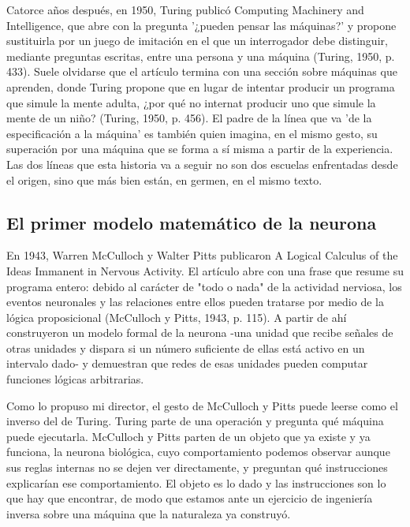 Catorce años después, en 1950, Turing publicó Computing Machinery and Intelligence, que abre con la pregunta '¿pueden pensar las máquinas?' y propone sustituirla por un juego de imitación en el que un interrogador debe distinguir, mediante preguntas escritas, entre una persona y una máquina (Turing, 1950, p. 433). Suele olvidarse que el artículo termina con una sección sobre máquinas que aprenden, donde Turing propone que en lugar de intentar producir un programa que simule la mente adulta, ¿por qué no internat producir uno que simule la mente de un niño? (Turing, 1950, p. 456). El padre de la línea que va 'de la especificación a la máquina' es también quien imagina, en el mismo gesto, su superación por una máquina que se forma a sí misma a partir de la experiencia. Las dos líneas que esta historia va a seguir no son dos escuelas enfrentadas desde el origen, sino que más bien están, en germen, en el mismo texto.

\subsection{El primer modelo matemático de la neurona}

En 1943, Warren McCulloch y Walter Pitts publicaron A Logical Calculus of the Ideas Immanent in Nervous Activity. El artículo abre con una frase que resume su programa entero: debido al carácter de "todo o nada" de la actividad nerviosa, los eventos neuronales y las relaciones entre ellos pueden tratarse por medio de la lógica proposicional (McCulloch y Pitts, 1943, p. 115). A partir de ahí construyeron un modelo formal de la neurona -una unidad que recibe señales de otras unidades y dispara si un número suficiente de ellas está activo en un intervalo dado- y demuestran que redes de esas unidades pueden computar funciones lógicas arbitrarias.

Como lo propuso mi director, el gesto de McCulloch y Pitts puede leerse como el inverso del de Turing. Turing parte de una operación y pregunta qué máquina puede ejecutarla. McCulloch y Pitts parten de un objeto que ya existe y ya funciona, la neurona biológica, cuyo comportamiento podemos observar aunque sus reglas internas no se dejen ver directamente, y preguntan qué instrucciones explicarían ese comportamiento. El objeto es lo dado y las instrucciones son lo que hay que encontrar, de modo que estamos ante un ejercicio de ingeniería inversa sobre una máquina que la naturaleza ya construyó.

